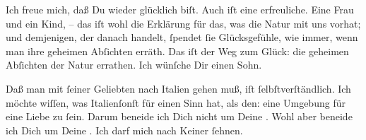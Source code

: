 \pstart
           Ich freue mich, daß Du wieder glücklich \label{K_L03064-3v}\label{K_L03064-3} biſt.
               Auch \label{K_L03064-4v}\label{K_L03064-4} iſt  eine erfreuliche. Eine Frau und ein Kind, – das iſt wohl die  Erklärung für das, was die Natur mit uns vorhat; und demjenigen, der danach
               handelt,{ }ſpendet{ }ſie Glücksgefühle, wie immer, wenn man ihre geheimen Abſichten
               erräth. Das iſt der Weg zum Glück: die geheimen Abſichten der Natur errathen. Ich
               wünſche Dir einen Sohn.\pend
           
\pstart
           {\pb}Daß man mit{ }ſeiner Geliebten nach Italien gehen muß, iſt{ }ſelbſtverſtändlich. Ich möchte wiſſen,
               was Italienſonſt \strikeout{\textcolor{gray}{×}\-\textcolor{gray}{×}} für einen Sinn hat, als den: eine Umgebung für eine Liebe zu{ }ſein. Darum
               beneide ich Dich nicht um Deine \label{K_L03064-5v}\label{K_L03064-5}. Wohl aber beneide ich Dich um Deine \label{K_L03064-6v}\label{K_L03064-6}. Ich darf mich nach Keiner{ }ſehnen.\pend
           
